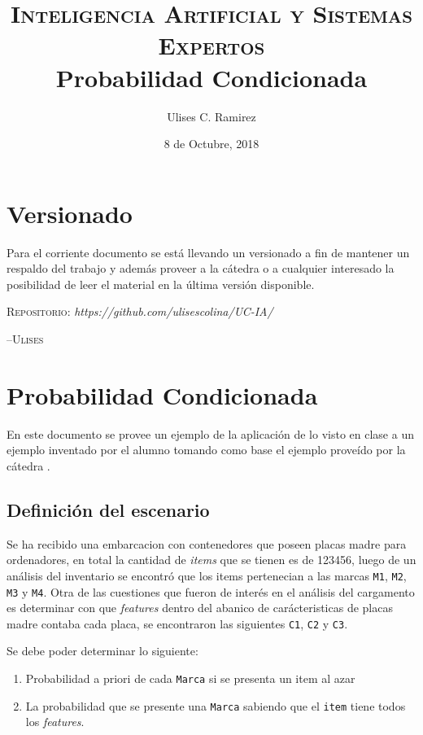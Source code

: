 \documentclass{article}
\title{\textsc{Inteligencia Artificial y Sistemas Expertos}\\Probabilidad
Condicionada}
\author{Ulises C. Ramirez}
\date{8 de Octubre, 2018}
\begin{document}
\maketitle
{}
\newpage
\section*{Versionado}
Para el corriente documento se est\'a llevando un versionado a fin de mantener un respaldo del trabajo y adem\'as proveer a la c\'atedra o a cualquier interesado la posibilidad de leer el material en la \'ultima versi\'on disponible.\\

\begin{center}
  \textsc{Repositorio}: \textit{https://github.com/ulisescolina/UC-IA/}
\end{center}

\hfill--\textsc{Ulises}
\newpage

\section*{Probabilidad Condicionada}
En este documento se provee un ejemplo de la aplicaci\'on de lo visto en
clase a un ejemplo inventado por el alumno tomando como base el ejemplo
prove\'ido por la c\'atedra \cite{sebpia2018}.

\subsection*{Definici\'on del escenario}
Se ha recibido una embarcacion con contenedores que poseen placas madre para
ordenadores, en total la cantidad de \textit{items} que se tienen es de
123456, luego de un an\'alisis del inventario se encontr\'o que los
items pertenecian a las marcas \texttt{M1}, \texttt{M2}, \texttt{M3} y
\texttt{M4}. Otra de las cuestiones que fueron de inter\'es en el an\'alisis
del cargamento es determinar con que \textit{features} dentro del abanico
de car\'acteristicas de placas madre contaba cada placa, se encontraron las
siguientes \texttt{C1}, \texttt{C2} y \texttt{C3}.

Se debe poder determinar lo siguiente:
\begin{enumerate}
\item Probabilidad a priori de cada \texttt{Marca} si se presenta un item al
azar
\item La probabilidad que se presente una \texttt{Marca} sabiendo que el
\texttt{item} tiene todos los \textit{features}.
\end{enumerate}
\end{document}
